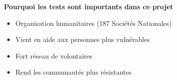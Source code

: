 \begin{frame}
\frametitle{}
\begin{block}{\textbf{Pourquoi les tests sont importants dans ce projet}}
\begin{itemize}
\item Organisation humanitaires (187 Sociétés Nationales)
\item Vient en aide aux personnes plus vulnérables
\item Fort réseau de volontaires
\item Rend les communautés plus résistantes
\end{itemize}
\end{block}


\end{frame}
